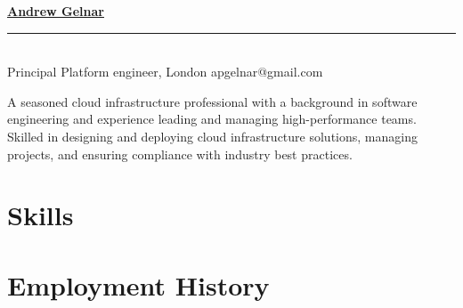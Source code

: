 \documentclass[10pt]{article} %
\begin{document}

{\huge{\textbf{\href{https://github.com/neoshrew/CV/blob/master/andrew_gelnar_cv.pdf}{Andrew Gelnar}}}}
\\
\rule{\textwidth}{0.5mm}
\\
Principal Platform engineer, London
\hfill
apgelnar@gmail.com


A seasoned cloud infrastructure professional with a background in software engineering and experience leading and managing high-performance teams. Skilled in designing and deploying cloud infrastructure solutions, managing projects, and ensuring compliance with industry best practices.

\vspace{-5mm}
\section{Skills}


\section{Employment History}
\end{document}
